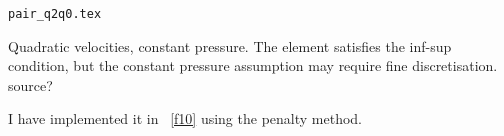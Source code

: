 \begin{flushright} {\tiny {\color{gray} \tt  pair\_q2q0.tex}} \end{flushright}

Quadratic velocities, constant pressure. The element satisfies the inf-sup condition, 
but the constant pressure assumption may require fine discretisation.
source?

I have implemented it in \stone~\ref{f10} using the penalty method.
